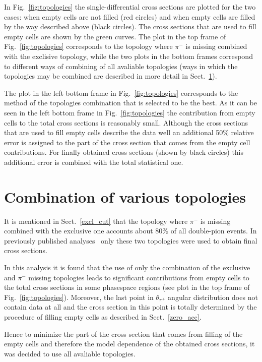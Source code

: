  In Fig.~\ref{fig:topologies} the single-differential cross sections are plotted for the two cases: when empty cells are not filled (red circles) and when empty cells are filled by the way described above (black circles). The cross sections that are used to fill empty cells are shown by the green curves. The plot in the top frame of Fig.~\ref{fig:topologies}  corresponds to the topology where $\pi^{-}$ is missing combined with the exclisive topology, while the two plots in the bottom frames correspond to different ways of combining of all avaliable topologies (ways in which the topologies may be combined are  described in more detail in Sect.~\ref{var_top}). 
 
The plot in the left bottom frame in Fig.~\ref{fig:topologies} corresponds to the method of the topologies combination that is selected to be the best. As it can be seen in the left bottom frame in Fig.~\ref{fig:topologies} the contribution from empty cells to the total cross sections is reasonably small. Although the cross sections that are used to fill empty cells describe the data well an additional 50\% relative error is assigned to the part of the cross section that comes from the empty cell contributions. For finally obtained cross sections (shown by black circles) this additional error is combined with the total statistical one.




\section{Combination of various topologies}
\label{var_top}

It is mentioned in Sect.~\ref{excl_cut} that the topology where $\pi^{-}$ is missing combined with the exclusive one accounts about 80\% of all double-pion events. In previously published analyses~\cite{Fedotov:2008aa,Isupov:note} only these two topologies were used to obtain final cross sections.

In this analysis it is found that the use of only the combination of the exclusive and  $\pi^{-}$ missing topologies leads to significant contributions from empty cells to the total cross sections in some phasespace regions (see plot in the top frame of Fig.~\ref{fig:topologies}). Moreover, the last point in $\theta_{\pi^{+}}$  angular distribution does not contain data at all and the cross section in this point is totally determined by the procedure of filling empty cells as described in Sect.~\ref{zero_acc}.

Hence to minimize the part of the cross section that comes from filling of the empty cells and therefore the model dependence of the obtained cross sections, it was decided to use all avaliable topologies.

